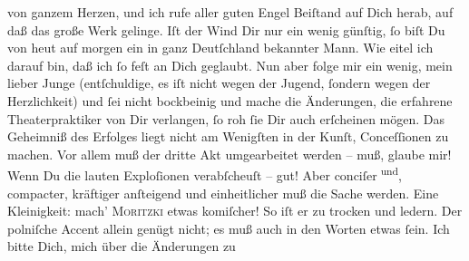 \begin{ledgroupsized}[t]{13cm}
               von ganzem Herzen, und ich rufe aller guten Engel Beiſtand auf Dich herab, auf daß
               das große Werk gelinge. Iſt
               der Wind Dir nur ein wenig günſtig, ſo biſt Du von heut auf morgen ein in ganz Deutſchland bekannter Mann. Wie eitel ich darauf
               bin, daß ich ſo feſt an Dich geglaubt. Nun aber folge mir ein wenig, mein lieber
               Junge (entſchuldige, es iſt nicht wegen der Jugend, ſondern {\pb}wegen der Herzlichkeit) und ſei nicht bockbeinig und
               mache die Änderungen, die erfahrene Theaterpraktiker  von Dir verlangen, ſo roh ſie Dir auch
               erſcheinen mögen. Das Geheimniß des Erfolges liegt nicht am Wenigſten in der Kunſt,
               Conceſſionen zu machen. Vor allem muß der dritte Akt umgearbeitet werden – muß, glaube mir! Wenn Du die
               lauten Exploſionen verabſcheuſt – gut! Aber conciſer\substVorne{}\textsuperscript{{ }und}\substDazwischen{},\substHinten{} compacter, kräftiger anſteigend und einheitlicher muß die Sache werden. Eine
               Kleinigkeit: mach’ \textsc{Moritzki} etwas komiſcher! {\pb}So iſt er zu trocken und
               ledern. Der polniſche Accent allein genügt nicht;
               es muß auch in den Worten etwas ſein. Ich bitte Dich, mich über die Änderungen
                  \label{K_L02675-2v}\label{K_L02675-2h} zu

\end{ledgroupsized}
